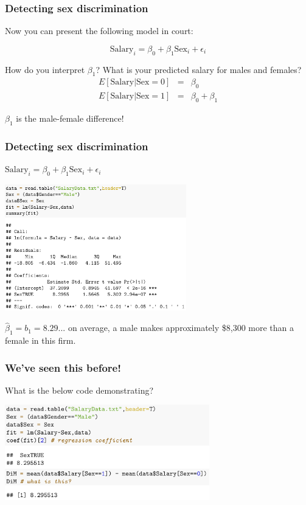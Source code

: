 \documentclass{beamer}
\newcommand{\sk}{\vspace{.5cm}}
\begin{document}
\begin{frame}
\frametitle{Detecting sex discrimination}
Now you can present the following model in court:

$$
\text{Salary}_i = \beta_0 + \beta_1\text{Sex}_i + \epsilon_i
$$

\sk
{\color{burntorange} How do you interpret $\beta_1$?  What is your predicted salary for males and females?} \pause
\begin{eqnarray*}
E[\text{Salary} | \text{Sex} = 0] &=& \beta_0 \\
E[\text{Salary} | \text{Sex} = 1] &=& \beta_0 + \beta_1
\end{eqnarray*}

\sk
$\beta_1$ is the male-female difference!

\end{frame}
\begin{frame}
\frametitle{Detecting sex discrimination}

\vspace{1mm}
\hspace*{30mm}$\text{Salary}_i = \beta_0 + \beta_1\text{Sex}_i + \epsilon_i$
\vspace{3mm}



\hspace*{10mm}\includegraphics[width=3.1in]{figures/sexMLR1}

\vspace{3mm}


{\small
{\color{burntorange}$\hat{\beta}_1 = b_1 = 8.29$... on average, a male makes approximately \$8,300 more than a female in this firm.} }

\end{frame}

\begin{frame}
	\frametitle{We've seen this before!}
	
	{What is the below code demonstrating?} \sk
	
\hspace*{8mm}\includegraphics[width=3.5in]{figures/sexMLR2}	
\end{frame}
\end{document}
